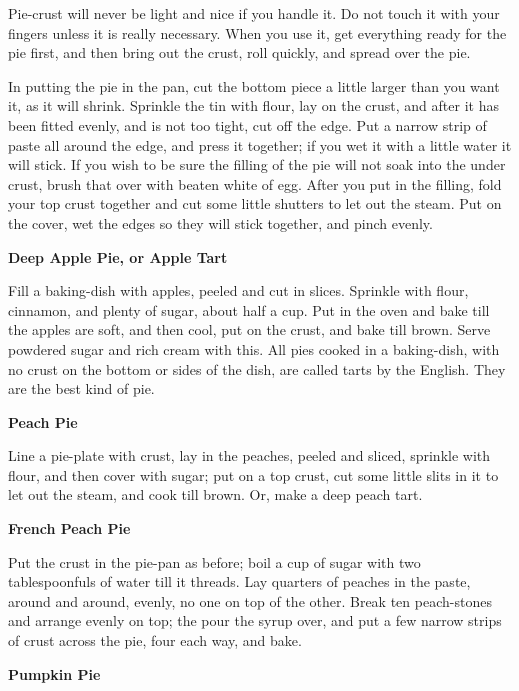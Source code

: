 \documentclass[11pt]{book}
\newcommand{\indpar}{\par\noindent\hspace*{\parindent}}
\newcommand{\instruction}{\indpar}
\newenvironment{RecipeTitle}{\medskip\begin{center}\large\bf }{\end{center}\smallskip}
\begin{document}
\instruction  Pie-crust will never be light and nice if you handle it.  Do
not touch it with your fingers unless it is really necessary.
When you use it, get everything ready for the pie first, and
then bring out the crust, roll quickly, and spread over the
pie.
\instruction  In putting the pie in the pan, cut the bottom piece a little
larger than you want it, as it will shrink.  Sprinkle the tin
with flour, lay on the crust, and after it has been fitted
evenly, and is not too tight, cut off the edge.  Put a narrow
strip of paste all around the edge, and press it together; if
you wet it with a little water it will stick.  If you wish to
be sure the filling of the pie will not soak into the under
crust, brush that over with beaten white of egg.  After you
put in the filling, fold your top crust together and cut some
little shutters to let out the steam.  Put on the cover, wet
the edges so they will stick together, and pinch evenly.
\begin{RecipeTitle}
Deep Apple Pie, or Apple Tart\label{deep_apple_pie_or_tart}
\end{RecipeTitle}
\instruction  Fill a baking-dish with apples, peeled and cut in slices.
Sprinkle with flour, cinnamon, and plenty of sugar, about half
a cup.  Put in the oven and bake till the apples are soft, and
then cool, put on the crust, and bake till brown.  Serve
powdered sugar and rich cream with this.  All pies cooked in a
baking-dish, with no crust on the bottom or sides of the dish,
are called tarts by the English.  They are the best kind of
pie.
\begin{RecipeTitle}
Peach Pie\label{peach_pie}
\end{RecipeTitle}
\instruction  Line a pie-plate with crust, lay in the peaches, peeled and
sliced, sprinkle with flour, and then cover with sugar; put on
a top crust, cut some little slits in it to let out the steam,
and cook till brown.  Or, make a deep peach tart.
\begin{RecipeTitle}
French Peach Pie\label{french_peach_pie}
\end{RecipeTitle}
\instruction  Put the crust in the pie-pan as before; boil a cup of sugar
with two tablespoonfuls of water till it threads.  Lay
quarters of peaches in the paste, around and around, evenly,
no one on top of the other.  Break ten peach-stones and
arrange evenly on top; the pour the syrup over, and put a few
narrow strips of crust across the pie, four each way, and
bake.\pagebreak[4]
\begin{RecipeTitle}
Pumpkin Pie\label{pumpkin_pie}
\end{RecipeTitle}
\end{document}

